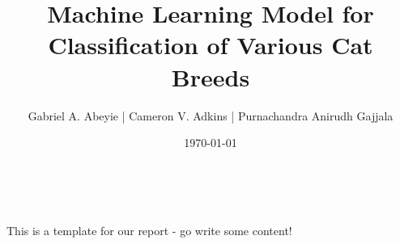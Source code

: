 \documentclass{article}
\title{Machine Learning Model for Classification of Various Cat Breeds}
\author{
Gabriel A. Abeyie |
Cameron V. Adkins |
Purnachandra Anirudh Gajjala
}
\date{\today}
\makeatletter
\renewcommand{\maketitle}{
    \bgroup\setlength{\parindent}{0pt}
    \begin{flushleft}
    \huge\textbf{\@title}
    \vspace*{0.2cm}

    \large\@author\\
    \@date
    \end{flushleft}\egroup
}
\makeatother
\begin{document}
    \maketitle
    \thispagestyle{empty}

    This is a template for our report - go write some content!

%
%
%        
\end{document}
